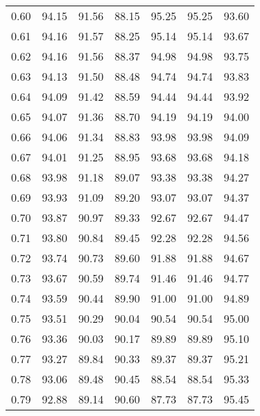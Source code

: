 \begin{tabular}{|c|c|c|c|c|c|c|}
      0.60 &     94.15 &     91.56 &      88.15 &   95.25 &      95.25 &         93.60 \\
      0.61 &     94.16 &     91.57 &      88.25 &   95.14 &      95.14 &         93.67 \\
      0.62 &     94.16 &     91.56 &      88.37 &   94.98 &      94.98 &         93.75 \\
      0.63 &     94.13 &     91.50 &      88.48 &   94.74 &      94.74 &         93.83 \\
      0.64 &     94.09 &     91.42 &      88.59 &   94.44 &      94.44 &         93.92 \\
      0.65 &     94.07 &     91.36 &      88.70 &   94.19 &      94.19 &         94.00 \\
      0.66 &     94.06 &     91.34 &      88.83 &   93.98 &      93.98 &         94.09 \\
      0.67 &     94.01 &     91.25 &      88.95 &   93.68 &      93.68 &         94.18 \\
      0.68 &     93.98 &     91.18 &      89.07 &   93.38 &      93.38 &         94.27 \\
      0.69 &     93.93 &     91.09 &      89.20 &   93.07 &      93.07 &         94.37 \\
      0.70 &     93.87 &     90.97 &      89.33 &   92.67 &      92.67 &         94.47 \\
      0.71 &     93.80 &     90.84 &      89.45 &   92.28 &      92.28 &         94.56 \\
      0.72 &     93.74 &     90.73 &      89.60 &   91.88 &      91.88 &         94.67 \\
      0.73 &     93.67 &     90.59 &      89.74 &   91.46 &      91.46 &         94.77 \\
      0.74 &     93.59 &     90.44 &      89.90 &   91.00 &      91.00 &         94.89 \\
      0.75 &     93.51 &     90.29 &      90.04 &   90.54 &      90.54 &         95.00 \\
      0.76 &     93.36 &     90.03 &      90.17 &   89.89 &      89.89 &         95.10 \\
      0.77 &     93.27 &     89.84 &      90.33 &   89.37 &      89.37 &         95.21 \\
      0.78 &     93.06 &     89.48 &      90.45 &   88.54 &      88.54 &         95.33 \\
      0.79 &     92.88 &     89.14 &      90.60 &   87.73 &      87.73 &         95.45 \\

\end{tabular}
